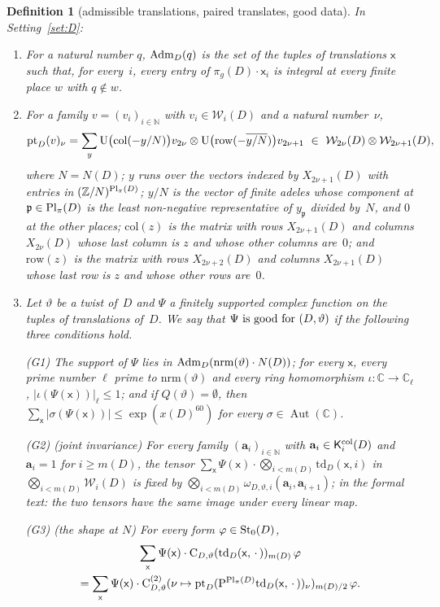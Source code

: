 \documentclass[11pt,a4paper]{article}
\newcommand{\Z}{\mathbb{Z}}
\theoremstyle{plainx}
\theoremstyle{uprightx}
\newtheorem{definition}[theorem]{Definition}
\newcommand{\CC}{\mathbb{C}}
\newcommand{\NN}{\mathbb{N}}
\newcommand{\cj}[1]{\overline{#1}}
\newcommand{\Aut}{\operatorname{Aut}(\CC)}
\newcommand{\xD}[1]{x(#1)}
\newcommand{\mD}[1]{m(#1)}
\newcommand{\ND}[1]{N(#1)}
\newcommand{\pig}[1]{\pi_g(#1)}
\newcommand{\XD}[2]{X_{#2}(#1)}
\newcommand{\td}[3]{\mathrm{td}_{#1}(#2,#3)}
\newcommand{\lkom}[3]{\omega_{#1,#2,#3}}
\newcommand{\chn}[4]{\mathrm{C}_{#1,#2}(#3)_{#4}}
\newcommand{\chnn}[4]{\mathrm{C}^{(2)}_{#1,#2}(#3)_{#4}}
\newcommand{\nrm}[1]{\mathrm{nrm}(#1)}
\newcommand{\Wfin}[2]{\mathcal{W}_{#2}(#1)}
\begin{document}
\begin{definition}[admissible translations, paired translates, good data]\label{d:good}
In Setting~\ref{set:D}:
\begin{enumerate}[label=(\alph*)]
\item For a natural number $q$, $\admT{q}$ is the set of the tuples of translations $\mathsf{x}$ such that, for
every~$i$, every entry of $\pig{D}\cdot\mathsf{x}_i$ is integral at every finite place $w$ with $q\notin w$.
\item For a family $v=(v_i)_{i\in\NN}$ with $v_i\in\Wfin{D}{i}$ and a natural number~$\nu$,
\[\pairT{v}{\nu}=\sum_{y}\mathrm{U}\bigl(\mathrm{col}(-y/N)\bigr)v_{2\nu}\otimes\mathrm{U}\bigl(\mathrm{row}(-\cj{y/N})\bigr)v_{2\nu+1}\ \in\ \Wfin{D}{2\nu}\otimes\Wfin{D}{2\nu+1},\]
where $N=\ND{D}$; $y$ runs over the vectors indexed by $\XD{D}{2\nu+1}$ with entries in
$(\Z/N)^{\piPl{D}}$; $y/N$ is the vector of finite adeles whose component at $\mathfrak{p}\in\piPl{D}$ is the least
non-negative representative of $y_{\mathfrak{p}}$ divided by~$N$, and $0$ at the other places;
$\mathrm{col}(z)$ is the matrix with rows $\XD{D}{2\nu+1}$ and columns $\XD{D}{2\nu}$ whose last column is $z$ and
whose other columns are~$0$; and $\mathrm{row}(z)$ is the matrix with rows $\XD{D}{2\nu+2}$ and columns
$\XD{D}{2\nu+1}$ whose last row is $z$ and whose other rows are~$0$.
\item Let $\vartheta$ be a twist of~$D$ and $\Psi$ a finitely supported complex function on the tuples of
translations of~$D$. We say that $\good{\vartheta}{\Psi}$ if the following three conditions hold.

\textup{(G1)} The support of $\Psi$ lies in $\admT{\nrm{\vartheta}\cdot\ND{D}}$; for every $\mathsf{x}$, every
prime number $\ell$ prime to $\nrm{\vartheta}$ and every ring homomorphism $\iota\colon\CC\to\CC_\ell$,
$|\iota(\Psi(\mathsf{x}))|_\ell\le1$; and if $Q(\vartheta)=\emptyset$, then
$\sum_{\mathsf{x}}|\sigma(\Psi(\mathsf{x}))|\le\exp(\xD{D}^{60})$ for every $\sigma\in\Aut$.

\textup{(G2)} (\emph{joint invariance}) For every family $(\mathbf{a}_i)_{i\in\NN}$ with $\mathbf{a}_i\in\colL{D}{i}$ and $\mathbf{a}_i=1$
for $i\ge \mD{D}$, the tensor
$\sum_{\mathsf{x}}\Psi(\mathsf{x})\cdot\bigotimes_{i<\mD{D}}\td{D}{\mathsf{x}}{i}$ in $\bigotimes_{i<\mD{D}}\Wfin{D}{i}$ is
fixed by $\bigotimes_{i<\mD{D}}\lkom{D}{\vartheta}{i}(\mathbf{a}_i,\mathbf{a}_{i+1})$; in the formal text: the two tensors have the same
image under every linear map.

\textup{(G3)} (\emph{the shape at $N$}) For every form $\varphi\in\Stg{D}{0}$,
\begin{multline*}
\sum_{\mathsf{x}}\Psi(\mathsf{x})\cdot\chn{D}{\vartheta}{\td{D}{\mathsf{x}}{\,\cdot\,}}{\mD{D}}\,\varphi\\
=\sum_{\mathsf{x}}\Psi(\mathsf{x})\cdot\chnn{D}{\vartheta}{\nu\mapsto\pairT{\mathrm{P}^{\piPl{D}}\td{D}{\mathsf{x}}{\,\cdot\,}}{\nu}}{\mD{D}/2}\,\varphi .
\end{multline*}
\end{enumerate}
\end{definition}
\end{document}
